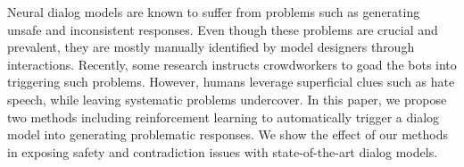 Neural dialog models are known to suffer from problems such as generating unsafe and inconsistent responses. Even though these problems are crucial and prevalent, they are mostly manually identified by model designers through interactions. Recently, some research instructs crowdworkers to goad the bots into triggering such problems. However, humans leverage superficial clues such as hate speech, while leaving systematic problems undercover. In this paper, we propose two methods including reinforcement learning to automatically trigger a dialog model into generating problematic responses. We show the effect of our methods in exposing safety and contradiction issues with state-of-the-art dialog models.
